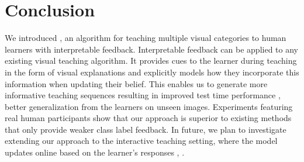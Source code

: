 \documentclass[../main.tex]{subfiles}
\begin{document}
\section{Conclusion}
\label{conclusion}
We introduced \EXPLAIN, an algorithm for teaching multiple visual categories to human learners with interpretable feedback.
Interpretable feedback can be applied to any existing visual teaching algorithm.
It provides cues to the learner during teaching in the form of visual explanations and explicitly models how they incorporate this information when updating their belief. 
This enables us to generate more informative teaching sequences resulting in improved test time performance \ie, better generalization from the learners on unseen images. 
Experiments featuring real human participants show that our approach is superior to existing methods that only provide weaker class label feedback.
In future, we plan to investigate extending our approach to the interactive teaching setting, where the model updates online based on the learner's responses \eg, \cite{singla2013actively,du2011active,johns2015}. 
\end{document}
